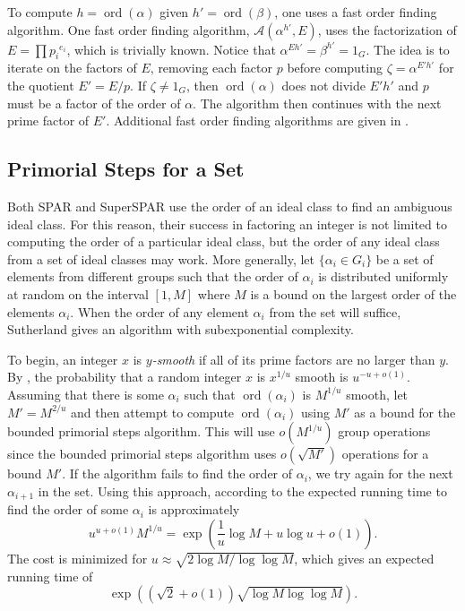 \documentclass{ucalgthes1}
\theoremstyle{definition}
\DeclareMathOperator{\ord}{ord}
\begin{document}
To compute $h = \ord(\alpha)$ given $h' = \ord(\beta)$, one uses a fast order finding algorithm.  One fast order finding algorithm, $\mathcal A(\alpha^{h'}, E)$, uses the factorization of $E=\prod {p_i}^{e_i}$, which is trivially known.  Notice that $\alpha^{Eh'} = \beta^{h'} = 1_G$.  The idea is to iterate on the factors of $E$, removing each factor $p$ before computing $\zeta = \alpha^{E'h'}$ for the quotient $E' = E/p$. If $\zeta \neq 1_G$, then $\ord(\alpha)$ does not divide $E'h'$ and $p$ must be a factor of the order of $\alpha$.  The algorithm then continues with the next prime factor of $E'$.  Additional fast order finding algorithms are given in \mbox{\cite[Chapter~7]{Sutherland2007}}.

\subsection{Primorial Steps for a Set}
\label{subsec:primorialStepsForASet}

Both SPAR and SuperSPAR use the order of an ideal class to find an ambiguous ideal class.  For this reason, their success in factoring an integer is not limited to computing the order of a particular ideal class, but the order of any ideal class from a set of ideal classes may work.  More generally, let $\{ \alpha_i \in G_i \}$ be a set of elements from different groups such that the order of $\alpha_i$ is distributed uniformly at random on the interval $[1, M]$ where $M$ is a bound on the largest order of the elements $\alpha_i$.  When the order of any element $\alpha_i$ from the set will suffice, Sutherland \cite[\S 5.4]{Sutherland2007} gives an algorithm with subexponential complexity.

To begin, an integer $x$ is \emph{$y$-smooth} if all of its prime factors are no larger than $y$.  By \cite[p.81]{Sutherland2007}, the probability that a random integer $x$ is $x^{1/u}$ smooth is $u^{-u+o(1)}$.  Assuming that there is some $\alpha_i$ such that $\ord(\alpha_i)$ is $M^{1/u}$ smooth, let $M'=M^{2/u}$ and then attempt to compute $\ord(\alpha_i)$ using $M'$ as a bound for the bounded primorial steps algorithm.  This will use $o(M^{1/u})$ group operations since the bounded primorial steps algorithm uses $o(\sqrt{M'})$ operations for a bound $M'$.  If the algorithm fails to find the order of $\alpha_i$, we try again for the next $\alpha_{i+1}$ in the set.  Using this approach, according to \cite[pp.81--82]{Sutherland2007} the expected running time to find the order of some $\alpha_i$ is approximately
\[
	u^{u+o(1)}M^{1/u} = \exp \left( \frac{1}{u}\log M + u \log u + o(1) \right).
\]
The cost is minimized for $u \approx \sqrt{2 \log M / \log \log M}$, which gives an expected running time of
\[
	\exp \left( \left( \sqrt2 + o(1) \right) \sqrt{\log M \log \log M} \right).
\]
\end{document}
